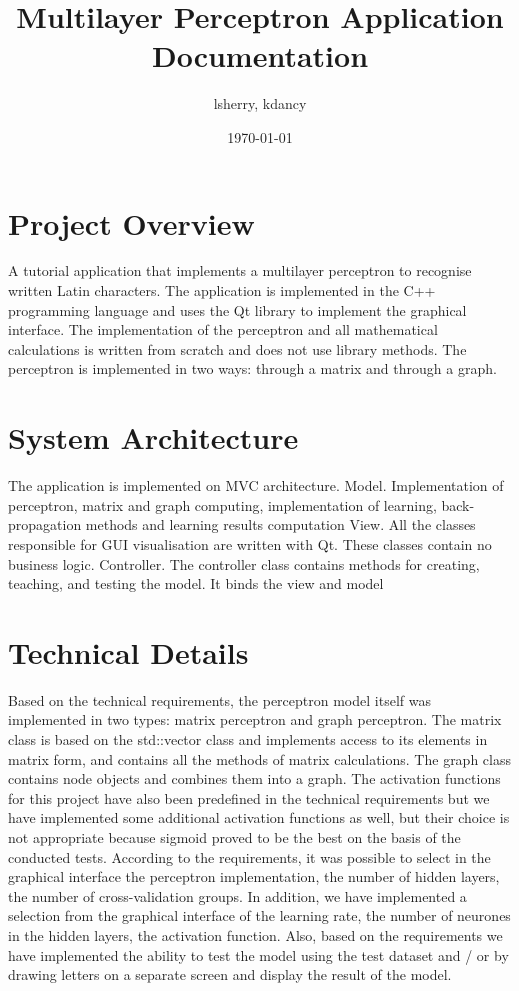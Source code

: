 \documentclass{article}
\title{Multilayer Perceptron Application Documentation}
\author{lsherry, kdancy}
\date{\today}
\begin{document}
\maketitle

\section{Project Overview}
A tutorial application that implements a multilayer perceptron to recognise written Latin characters. The application is implemented in the C++ programming language and uses the Qt library to implement the graphical interface. The implementation of the perceptron and all mathematical calculations is written from scratch and does not use library methods. The perceptron is implemented in two ways: through a matrix and through a graph.

\section{System Architecture}
The application is implemented on MVC architecture.
Model. Implementation of perceptron, matrix and graph computing, implementation of learning, back-propagation methods and learning results computation
View. All the classes responsible for GUI visualisation are written with Qt. These classes contain no business logic.
Controller. The controller class contains methods for creating, teaching, and testing the model. It binds the view and model

\section{Technical Details}
Based on the technical requirements, the perceptron model itself was implemented in two types: matrix perceptron and graph perceptron. The matrix class is based on the std::vector class and implements access to its elements in matrix form, and contains all the methods of matrix calculations. The graph class contains node objects and combines them into a graph.
The activation functions for this project have also been predefined in the technical requirements but we have implemented some additional activation functions as well, but their choice is not appropriate because sigmoid proved to be the best on the basis of the conducted tests.
According to the requirements, it was possible to select in the graphical interface the perceptron implementation, the number of hidden layers, the number of cross-validation groups. In addition, we have implemented a selection from the graphical interface of the learning rate, the number of neurones in the hidden layers, the activation function.
Also, based on the requirements we have implemented the ability to test the model using the test dataset and / or by drawing letters on a separate screen and display the result of the model.
\end{document}

